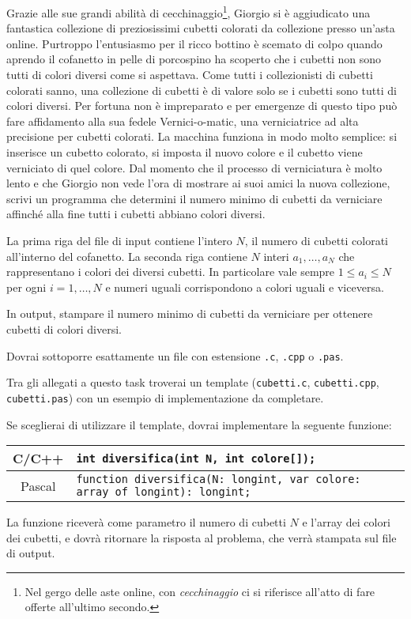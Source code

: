 
Grazie alle sue grandi abilità di cecchinaggio\footnote{Nel gergo delle aste online, con \emph{cecchinaggio} ci si riferisce all'atto di fare offerte all'ultimo secondo.}, Giorgio si è aggiudicato una fantastica collezione di preziosissimi cubetti colorati da collezione presso un'asta online. Purtroppo l'entusiasmo per il ricco bottino è scemato di colpo quando aprendo il cofanetto in pelle di porcospino ha scoperto che i cubetti non sono tutti di colori diversi come si aspettava. Come tutti i collezionisti di cubetti colorati sanno, una collezione di cubetti è di valore solo se i cubetti sono tutti di colori diversi. Per fortuna non è impreparato e per emergenze di questo tipo può fare affidamento alla sua fedele Vernici-o-matic\texttrademark, una verniciatrice ad alta precisione per cubetti colorati. La macchina funziona in modo molto semplice: si inserisce un cubetto colorato, si imposta il nuovo colore e il cubetto viene verniciato di quel colore. Dal momento che il processo di verniciatura è molto lento e che Giorgio non vede l'ora di mostrare ai suoi amici la nuova collezione, scrivi un programma che determini il numero minimo di cubetti da verniciare affinché alla fine tutti i cubetti abbiano colori diversi.

\InputFile
La prima riga del file di input contiene l'intero $N$, il numero di cubetti colorati all'interno del cofanetto. La seconda riga contiene $N$ interi $a_1, \ldots, a_N$ che rappresentano i colori dei diversi cubetti. In particolare vale sempre $1 \le a_i \le N$ per ogni $i=1,\ldots,N$ e numeri uguali corrispondono a colori uguali e viceversa.

\OutputFile
In output, stampare il numero minimo di cubetti da verniciare per ottenere cubetti di colori diversi.

\Implementation
Dovrai sottoporre esattamente un file con estensione \texttt{.c}, \texttt{.cpp} o \texttt{.pas}.

\begin{warning}
Tra gli allegati a questo task troverai un template (\texttt{cubetti.c}, \texttt{cubetti.cpp}, \texttt{cubetti.pas}) con un esempio di implementazione da completare.
\end{warning}

Se sceglierai di utilizzare il template, dovrai implementare la seguente funzione:
\begin{center}\begin{tabularx}{\textwidth}{|c|X|}
\hline
C/C++  & \verb|int diversifica(int N, int colore[]);|\\
\hline
Pascal & \small\verb|function diversifica(N: longint, var colore: array of longint): longint;|\\
\hline
\end{tabularx}\end{center}
La funzione riceverà come parametro il numero di cubetti $N$ e l'array dei colori dei cubetti, e dovrà ritornare la risposta al problema, che verrà stampata sul file di output.

